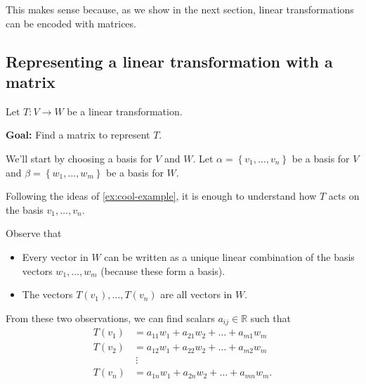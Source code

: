 \documentclass[10pt]{article}
\theoremstyle{definition}
\newcommand{\fl}[1]{\noindent\textbf{#1}}            %
\newcommand{\R}{\mathbb{R}}           %
\begin{document}
This makes sense because, as we show in the next section, linear
transformations can be encoded with matrices. 

\subsection{Representing a linear transformation with a matrix}

Let
$T:V \to W$ be a linear transformation.

\fl{Goal:} Find a matrix to represent $T$.

We'll start by choosing a basis for $V$ and $W$. Let
$\alpha = \left\{v_{1},\ldots,v_{n}\right\} $ be a basis for $V$ and
$\beta = \left\{w_{1},\ldots,w_{m}\right\}$ be a basis for $W$.

Following the ideas of \cref{ex:cool-example}, it is enough to understand how
$T$ acts on the basis $v_{1},\ldots,v_{n}$.

Observe that
\begin{itemize}
  \item Every vector in $W$ can be written as a unique linear combination of
  the basis vectors $w_{1},\ldots,w_{m}$ (because these form a basis).
  \item The vectors $T(v_{1}),\ldots,T(v_{n})$ are all vectors in $W$.
\end{itemize}
From these two observations, we can find scalars $a_{ij}\in \R$ such that
\begin{align*}
  T(v_{1}) &= a_{11}w_{1}+a_{21}w_{2}+\ldots+a_{m1}w_{m}\\
  T(v_{2}) &= a_{12}w_{1}+a_{22}w_{2}+\ldots+a_{m2}w_{m}\\
           &\ \vdots\\
  T(v_{n}) &= a_{1n}w_{1}+a_{2n}w_{2}+\ldots+a_{mn}w_{m}.
\end{align*}
\end{document}
